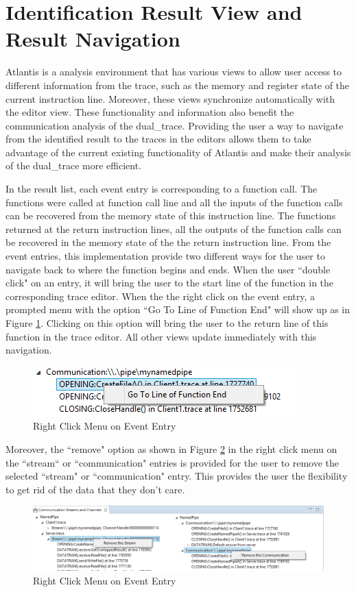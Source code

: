 \section{Identification Result View and Result Navigation}
Atlantis is a analysis environment that has various views to allow user access to different information from the trace, such as the memory and register state of the current instruction line. Moreover, these views synchronize automatically with the editor view. These functionality and information also benefit the communication analysis of the dual\_trace. Providing the user a way to navigate from the identified result to the traces in the editors allows them to take advantage of the current existing functionality of Atlantis and make their analysis of the dual\_trace more efficient.

In the result list, each event entry is corresponding to a function call. The functions were called at function call line and all the inputs of the function calls can be recovered from the memory state of this instruction line. The functions returned at the return instruction lines, all the outputs of the function calls can be recovered in the memory state of the the return instruction line. From the event entries, this implementation provide two different ways for the user to navigate back to where the function begins and ends. When the user ``double click" on an entry, it will bring the user to the start line of the function in the corresponding trace editor. When the the right click on the event entry, a prompted menu with the option ``Go To Line of Function End" will show up as in Figure \ref{gotoend}. Clicking on this option will bring the user to the return line of this function in the trace editor. All other views update immediately with this navigation. 

\begin{figure}[H]
\centerline{\includegraphics{Figures/gotoend}}
 \caption{Right Click Menu on Event Entry}
\label{gotoend}
\end{figure}

Moreover, the ``remove" option as shown in Figure \ref{remove} in the right click menu on the ``stream“ or ``communication" entries is provided for the user to remove the selected ``stream" or ``communication" entry. This provides the user the flexibility to get rid of the data that they don't care.

\begin{figure}[H]
\centerline{\includegraphics[scale=0.7]{Figures/remove}}
 \caption{Right Click Menu on Event Entry}
\label{remove}
\end{figure}

